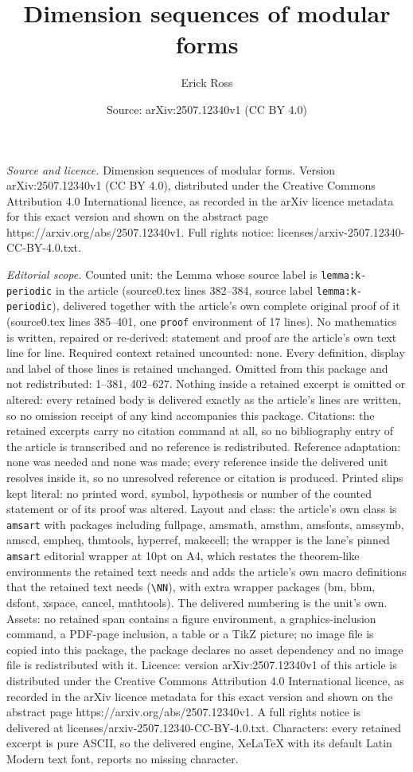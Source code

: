\documentclass[10pt,a4paper]{amsart}
\title[Dimension sequences of modular forms]{Dimension sequences of modular forms}
\author{Erick Ross}
\date{Source: arXiv:2507.12340v1 (CC BY 4.0)}
\begin{document}
\maketitle

\noindent\emph{Source and licence.} Dimension sequences of modular forms. Version arXiv:2507.12340v1 (CC BY 4.0), distributed under the Creative Commons Attribution 4.0 International licence, as recorded in the arXiv licence metadata for this exact version and shown on the abstract page https://arxiv.org/abs/2507.12340v1. Full rights notice: licenses/arxiv-2507.12340-CC-BY-4.0.txt.\par\smallskip

\noindent\textit{Editorial scope.} Counted unit: the Lemma whose source label is \texttt{lemma:k-periodic} in the article (source0.tex lines 382--384, source label \texttt{lemma:k-periodic}), delivered together with the article's own complete original proof of it (source0.tex lines 385--401, one \texttt{proof} environment of 17 lines). No mathematics is written, repaired or re-derived: statement and proof are the article's own text line for line. Required context retained uncounted: none. Every definition, display and label of those lines is retained unchanged. Omitted from this package and not redistributed: 1--381, 402--627. Nothing inside a retained excerpt is omitted or altered: every retained body is delivered exactly as the article's lines are written, so no omission receipt of any kind accompanies this package. Citations: the retained excerpts carry no citation command at all, so no bibliography entry of the article is transcribed and no reference is redistributed. Reference adaptation: none was needed and none was made; every reference inside the delivered unit resolves inside it, so no unresolved reference or citation is produced. Printed slips kept literal: no printed word, symbol, hypothesis or number of the counted statement or of its proof was altered. Layout and class: the article's own class is \texttt{amsart} with packages including fullpage, amsmath, amsthm, amsfonts, amssymb, amscd, empheq, thmtools, hyperref, makecell; the wrapper is the lane's pinned \texttt{amsart} editorial wrapper at 10pt on A4, which restates the theorem-like environments the retained text needs and adds the article's own macro definitions that the retained text needs (\texttt{\textbackslash NN}), with extra wrapper packages (bm, bbm, dsfont, xspace, cancel, mathtools). The delivered numbering is the unit's own. Assets: no retained span contains a figure environment, a graphics-inclusion command, a PDF-page inclusion, a table or a TikZ picture; no image file is copied into this package, the package declares no asset dependency and no image file is redistributed with it. Licence: version arXiv:2507.12340v1 of this article is distributed under the Creative Commons Attribution 4.0 International licence, as recorded in the arXiv licence metadata for this exact version and shown on the abstract page https://arxiv.org/abs/2507.12340v1. A full rights notice is delivered at licenses/arxiv-2507.12340-CC-BY-4.0.txt. Characters: every retained excerpt is pure ASCII, so the delivered engine, XeLaTeX with its default Latin Modern text font, reports no missing character.
\end{document}
